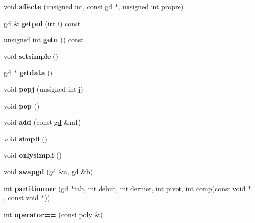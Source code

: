 \begin{DoxyCompactItemize}
\item 
\mbox{\label{classmmgd_1_1poly_ad8b13c9086778f9461ae8460ecca0d28}} 
void {\bfseries affecte} (unsigned int, const \mbox{\hyperlink{classmmgd_1_1gd}{gd}} $\ast$, unsigned int propre)
\item 
\mbox{\label{classmmgd_1_1poly_ae5b5e62d2e6a5a820b71f939f4d06872}} 
\mbox{\hyperlink{classmmgd_1_1gd}{gd}} \& {\bfseries getpol} (int i) const
\item 
\mbox{\label{classmmgd_1_1poly_a2f4f968f61c7af5aff9e349f65d0da23}} 
unsigned int {\bfseries getn} () const
\item 
\mbox{\label{classmmgd_1_1poly_a5495fb6ca0d7c61bb5b206f559ffcf01}} 
void {\bfseries setsimple} ()
\item 
\mbox{\label{classmmgd_1_1poly_a18c1e001f43ce42745d7b2be6890cc3f}} 
\mbox{\hyperlink{classmmgd_1_1gd}{gd}} $\ast$ {\bfseries getdata} ()
\item 
\mbox{\label{classmmgd_1_1poly_a184a9b26eed443676f8d55919856a363}} 
void {\bfseries popj} (unsigned int j)
\item 
\mbox{\label{classmmgd_1_1poly_a8b72b2a38fe605ee83d03c546315feaa}} 
void {\bfseries pop} ()
\item 
\mbox{\label{classmmgd_1_1poly_a0b40ee1475cd9d321ddea43dde871321}} 
void {\bfseries add} (const \mbox{\hyperlink{classmmgd_1_1gd}{gd}} \&m1)
\item 
\mbox{\label{classmmgd_1_1poly_a49ff0c355621ee90b83986b5c21a681b}} 
void {\bfseries simpli} ()
\item 
\mbox{\label{classmmgd_1_1poly_a7c0e2e60fb473ecd70af742d6cfb8214}} 
void {\bfseries onlysimpli} ()
\item 
\mbox{\label{classmmgd_1_1poly_a5033ce10a8708ca2a6d43d31ac0abb70}} 
void {\bfseries swapgd} (\mbox{\hyperlink{classmmgd_1_1gd}{gd}} \&a, \mbox{\hyperlink{classmmgd_1_1gd}{gd}} \&b)
\item 
\mbox{\label{classmmgd_1_1poly_ab3bd363ed00bc3be3d31b0e9e79debde}} 
int {\bfseries partitionner} (\mbox{\hyperlink{classmmgd_1_1gd}{gd}} $\ast$tab, int debut, int dernier, int pivot, int comp(const void $\ast$, const void $\ast$))
\item 
\mbox{\label{classmmgd_1_1poly_ae121ae3e10e8252bc9b9c1b745867a8b}} 
int {\bfseries operator==} (const \mbox{\hyperlink{classmmgd_1_1poly}{poly}} \&)
\end{DoxyCompactItemize}
